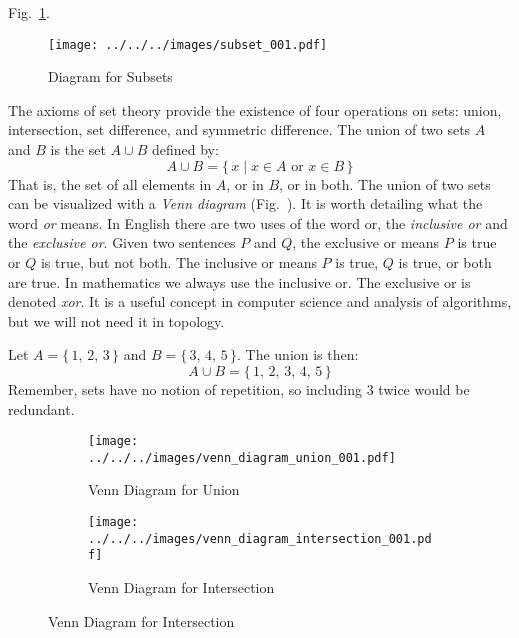 \documentclass{article}
\theoremstyle{plain}
\theoremstyle{normal}
\newenvironment{example}{%
    \pushQED{\qed}\renewcommand{\qedsymbol}{$\blacksquare$}\examplex%
}{%
    \popQED\endexamplex%
}
\newenvironment{definition}{%
    \pushQED{\qed}\renewcommand{\qedsymbol}{$\blacksquare$}\definitionx%
}{%
    \popQED\enddefinitionx%
}
\begin{document}
        Fig.~\ref{fig:subset_001}.
        \begin{figure}
            \centering
            \texttt{[image: ../../../images/subset\_001.pdf]}
            \caption{Diagram for Subsets}
            \label{fig:subset_001}
        \end{figure}
        \par\hfill\par
        The axioms of set theory provide the existence of four operations on
        sets: union, intersection, set difference, and symmetric difference.
        \begin{definition}[\textbf{Union of Two Sets}]
            The union of two sets $A$ and $B$ is the set $A\cup{B}$ defined
            by:
            \begin{equation}
                A\cup{B}=\{\,x\;|\;x\in{A}\textrm{ or }x\in{B}\,\}
            \end{equation}
            That is, the set of all elements in $A$, or in $B$, or in both.
        \end{definition}
        The union of two sets can be visualized with a
        \textit{Venn diagram} (Fig.~). It is
        worth detailing what the word \textit{or} means. In English there are
        two uses of the word or, the \textit{inclusive or} and the
        \textit{exclusive or}. Given two sentences $P$ and $Q$, the exclusive or
        means $P$ is true or $Q$ is true, but not both. The inclusive or means
        $P$ is true, $Q$ is true, or both are true. In mathematics we always
        use the inclusive or. The exclusive or is denoted \textit{xor}. It is
        a useful concept in computer science and analysis of algorithms, but we
        will not need it in topology.
        \begin{example}
            Let $A=\{\,1,\,2,\,3\,\}$ and $B=\{\,3,\,4,\,5\,\}$. The union
            is then:
            \begin{equation}
                A\cup{B}=\{\,1,\,2,\,3,\,4,\,5\,\}
            \end{equation}
            Remember, sets have no notion of repetition, so including 3 twice
            would be redundant.
        \end{example}
        \begin{figure}
            \centering
            \begin{subfigure}[b]{0.49\textwidth}
                \centering
                \texttt{[image: ../../../images/venn\_diagram\_union\_001.pdf]}
                \caption{Venn Diagram for Union}
                \label{fig:venn_diagram_union_001}
            \end{subfigure}
            \begin{subfigure}[b]{0.49\textwidth}
                \centering
                \texttt{[image: ../../../images/venn\_diagram\_intersection\_001.pdf]}
                \caption{Venn Diagram for Intersection}
                \label{fig:venn_diagram_intersection_001}
            \end{subfigure}
        \end{figure}
\end{document}

